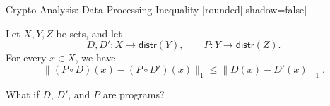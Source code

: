 \begin{frame}{Crypto Analysis: Data Processing Inequality}
  [rounded][shadow=false]
  \begin{theorem}
    Let $X,Y,Z$ be sets, and let
    \[
      D,D' : X\longrightarrow\mathsf{distr}(Y),
      \qquad P : Y\longrightarrow\mathsf{distr}(Z).
    \]
    For every $x\in X$, we have
    \[
      \bigl\|(P\circ D)(x)-(P\circ D')(x)\bigr\|_1
        \leq \bigl\|D(x)-D'(x)\bigr\|_1.
    \]
  \end{theorem}
  \pause
  \vspace{0.7em}
  \begin{center}
    {\large What if $D$, $D'$, and $P$ are programs?}
  \end{center}
\end{frame}
